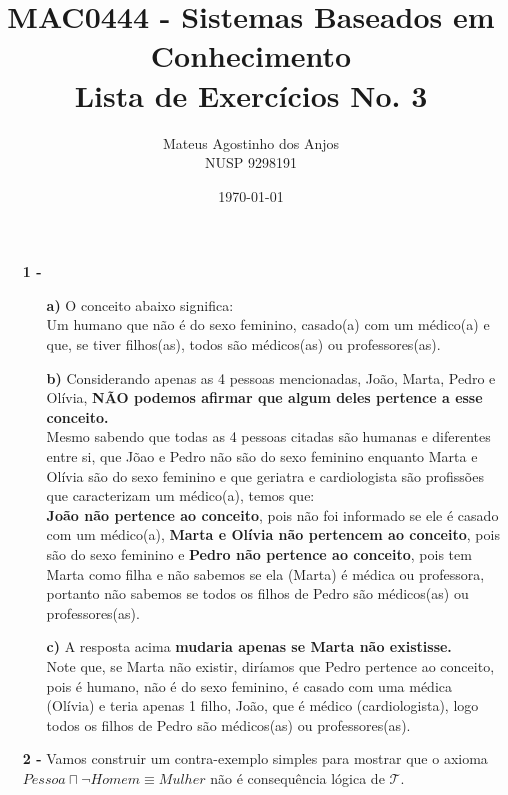 \documentclass[12pt]{article}
\title{MAC0444 - Sistemas Baseados em Conhecimento \\
Lista de Exercícios No. 3
}
\author{Mateus Agostinho dos Anjos\\NUSP 9298191}
\date{\today}
\begin{document}
	\maketitle
	\begin{itemize}
		\item[\textbf{1 -}]
			\hfill\newline
			\begin{itemize}
				\item[\textbf{a) }]
					\hfill\newline
					O conceito abaixo significa:\\
					Um humano que não é do sexo feminino, casado(a) com um médico(a) e que,
					se tiver filhos(as), todos são médicos(as) ou professores(as). 
				\item[\textbf{b) }]
					\hfill\newline
					Considerando apenas as 4 pessoas mencionadas, João, Marta, Pedro
					e Olívia, \textbf{NÃO podemos afirmar que algum deles pertence a esse conceito.}\\
					Mesmo sabendo que todas as 4 pessoas citadas são humanas e diferentes entre si,
					que Jõao e Pedro não são do sexo feminino enquanto Marta e Olívia são do sexo feminino
					e que geriatra e cardiologista são profissões que caracterizam um médico(a),
					temos que:\\ 
					\textbf{João não pertence ao conceito}, pois não foi informado se ele é casado com
					um médico(a), \textbf{Marta e Olívia não pertencem ao conceito}, pois são do sexo
					feminino e \textbf{Pedro não pertence ao conceito}, pois tem Marta como filha e não
					sabemos se ela (Marta) é médica ou professora,
					portanto não sabemos se todos os filhos de Pedro são médicos(as) ou professores(as).
					\newpage
				\item[\textbf{c) }]
					\hfill\newline
					A resposta acima \textbf{mudaria apenas se Marta não existisse.}\\
					Note que, se Marta não existir, diríamos que Pedro pertence ao conceito, 
					pois é humano, não é do sexo feminino, é casado com uma médica (Olívia) e
					teria apenas 1 filho, João, que é médico (cardiologista), logo todos os filhos
					de Pedro são médicos(as) ou professores(as).
			\end{itemize}
		\item[\textbf{2 -}]
			\hfill\newline
			Vamos construir um contra-exemplo simples para mostrar que o
			axioma $Pessoa \sqcap \neg Homem \equiv Mulher$ não é
			consequência lógica de $\mathcal{T}$.\\
			

\end{itemize}
\end{document}
